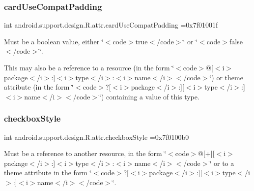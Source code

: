 \subsubsection{\texorpdfstring{card\+Use\+Compat\+Padding}{cardUseCompatPadding}}
{\footnotesize\ttfamily int android.\+support.\+design.\+R.\+attr.\+card\+Use\+Compat\+Padding =0x7f01001f\hspace{0.3cm}{\ttfamily [static]}}

Must be a boolean value, either \char`\"{}$<$code$>$true$<$/code$>$\char`\"{} or \char`\"{}$<$code$>$false$<$/code$>$\char`\"{}. 

This may also be a reference to a resource (in the form \char`\"{}$<$code$>$@\mbox{[}$<$i$>$package$<$/i$>$\+:\mbox{]}$<$i$>$type$<$/i$>$\+:$<$i$>$name$<$/i$>$$<$/code$>$\char`\"{}) or theme attribute (in the form \char`\"{}$<$code$>$?\mbox{[}$<$i$>$package$<$/i$>$\+:\mbox{]}\mbox{[}$<$i$>$type$<$/i$>$\+:\mbox{]}$<$i$>$name$<$/i$>$$<$/code$>$\char`\"{}) containing a value of this type. \mbox{\label{classandroid_1_1support_1_1design_1_1R_1_1attr_a872314306a26ac20bfcc115120e40dd5}} 
\subsubsection{\texorpdfstring{checkbox\+Style}{checkboxStyle}}
{\footnotesize\ttfamily int android.\+support.\+design.\+R.\+attr.\+checkbox\+Style =0x7f0100b0\hspace{0.3cm}{\ttfamily [static]}}

Must be a reference to another resource, in the form \char`\"{}$<$code$>$@\mbox{[}+\mbox{]}\mbox{[}$<$i$>$package$<$/i$>$\+:\mbox{]}$<$i$>$type$<$/i$>$\+:$<$i$>$name$<$/i$>$$<$/code$>$\char`\"{} or to a theme attribute in the form \char`\"{}$<$code$>$?\mbox{[}$<$i$>$package$<$/i$>$\+:\mbox{]}\mbox{[}$<$i$>$type$<$/i$>$\+:\mbox{]}$<$i$>$name$<$/i$>$$<$/code$>$\char`\"{}. \mbox{\label{classandroid_1_1support_1_1design_1_1R_1_1attr_a434948ae3f1dd8ba90cfe1ebc224b6cc}} 
